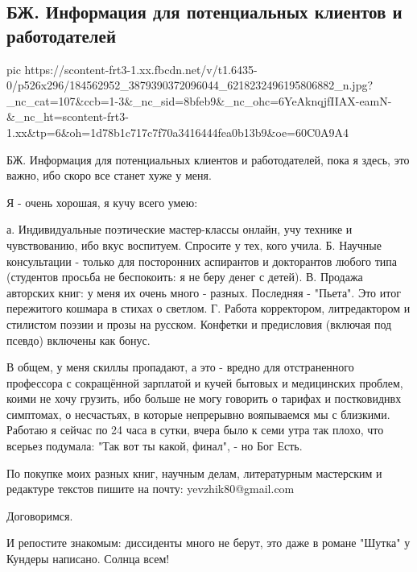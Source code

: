  
 
 
 
 
\subsection{БЖ. Информация для потенциальных клиентов и работодателей}

\ifcmt
  pic https://scontent-frt3-1.xx.fbcdn.net/v/t1.6435-0/p526x296/184562952_3879390372096044_6218232496195806882_n.jpg?_nc_cat=107&ccb=1-3&_nc_sid=8bfeb9&_nc_ohc=6YeAknqjfIIAX-eamN-&_nc_ht=scontent-frt3-1.xx&tp=6&oh=1d78b1c717c7f70a3416444fea0b13b9&oe=60C0A9A4
\fi

БЖ. Информация для потенциальных клиентов и работодателей, пока я здесь, это
важно, ибо скоро все станет хуже у меня.

Я - очень хорошая, я кучу всего умею: 

а. Индивидуальные поэтические мастер-классы онлайн, учу технике и чувствованию, ибо вкус воспитуем. Спросите у тех, кого учила.
Б. Научные консультации - только  для посторонних аспирантов и докторантов любого типа (студентов просьба не беспокоить: я не беру денег с детей). 
В. Продажа авторских книг: у меня их очень много - разных. Последняя - "Пьета". Это итог пережитого кошмара в стихах о светлом.
Г. Работа корректором, литредактором и стилистом поэзии и прозы на русском. Конфетки и предисловия (включая под псевдо) включены как бонус.

В общем, у меня скиллы пропадают, а это - вредно для отстраненного профессора с
сокращённой зарплатой и кучей бытовых и медицинских проблем, коими не хочу
грузить, ибо больше не могу говорить о тарифах и постковиднвх симптомах, о
несчастьях, в которые непрерывно вояпываемся мы с близкими. Работаю я сейчас по
24 часа в сутки, вчера было к семи утра так плохо, что всерьез подумала: "Так
вот ты какой, финал", - но Бог Есть.

По покупке моих разных книг, научным делам, литературным мастерским и редактуре
текстов пишите на почту: yevzhik80@gmail.com 

Договоримся.

И репостите знакомым: диссиденты много не берут, это даже в романе "Шутка" у
Кундеры написано. Солнца всем!
